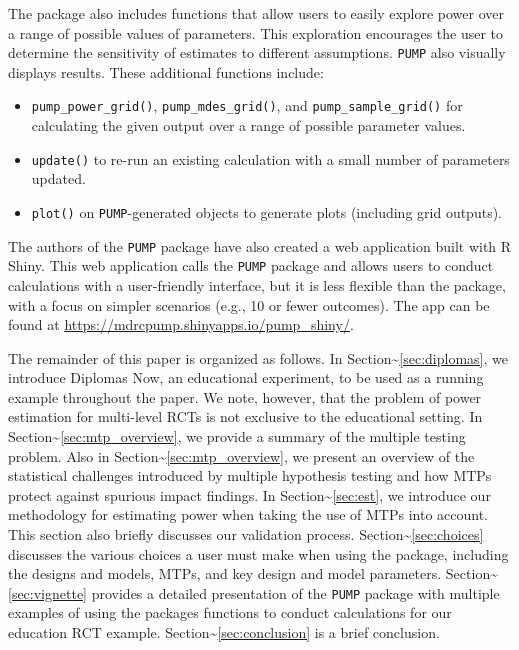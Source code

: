 \documentclass[
]{jss}
\providecommand{\tightlist}{%
  \setlength{\itemsep}{0pt}\setlength{\parskip}{0pt}}
\begin{document}
The package also includes functions that allow users to easily explore
power over a range of possible values of parameters. This exploration
encourages the user to determine the sensitivity of estimates to
different assumptions. \texttt{PUMP} also visually displays results.
These additional functions include:

\begin{itemize}
\tightlist
\item
  \texttt{pump\_power\_grid()}, \texttt{pump\_mdes\_grid()}, and
  \texttt{pump\_sample\_grid()} for calculating the given output over a
  range of possible parameter values.
\item
  \texttt{update()} to re-run an existing calculation with a small
  number of parameters updated.
\item
  \texttt{plot()} on \texttt{PUMP}-generated objects to generate plots
  (including grid outputs).
\end{itemize}

The authors of the \texttt{PUMP} package have also created a web
application built with R Shiny. This web application calls the
\texttt{PUMP} package and allows users to conduct calculations with a
user-friendly interface, but it is less flexible than the package, with
a focus on simpler scenarios (e.g., 10 or fewer outcomes). The app can
be found at \url{https://mdrcpump.shinyapps.io/pump_shiny/}.

The remainder of this paper is organized as follows. In
Section\textasciitilde{}\ref{sec:diplomas}, we introduce Diplomas Now,
an educational experiment, to be used as a running example throughout
the paper. We note, however, that the problem of power estimation for
multi-level RCTs is not exclusive to the educational setting. In
Section\textasciitilde{}\ref{sec:mtp_overview}, we provide a summary of
the multiple testing problem. Also in
Section\textasciitilde{}\ref{sec:mtp_overview}, we present an overview
of the statistical challenges introduced by multiple hypothesis testing
and how MTPs protect against spurious impact findings. In
Section\textasciitilde{}\ref{sec:est}, we introduce our methodology for
estimating power when taking the use of MTPs into account. This section
also briefly discusses our validation process.
Section\textasciitilde{}\ref{sec:choices} discusses the various choices
a user must make when using the package, including the designs and
models, MTPs, and key design and model parameters.
Section\textasciitilde{}\ref{sec:vignette} provides a detailed
presentation of the \texttt{PUMP} package with multiple examples of
using the packages functions to conduct calculations for our education
RCT example. Section\textasciitilde{}\ref{sec:conclusion} is a brief
conclusion.
\end{document}
